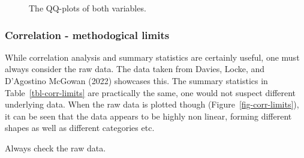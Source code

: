 \documentclass[
  a4paper,
]{scrbook}
\begin{document}
\begin{figure}[ht]


\caption{\label{fig-drive-shaft-spear-qq}The QQ-plots of both
variables.}

\end{figure}%

\subsubsection{Correlation - methodogical
limits}\label{correlation---methodogical-limits}

While correlation analysis and summary statistics are certainly useful,
one must always consider the raw data. The data taken from Davies,
Locke, and D'Agostino McGowan (2022) showcases this. The summary
statistics in Table~\ref{tbl-corr-limits} are practically the same, one
would not suspect different underlying data. When the raw data is
plotted though (Figure~\ref{fig-corr-limits}), it can be seen that the
data appears to be highly non linear, forming different shapes as well
as different categories etc.

Always check the raw data.
\end{document}

